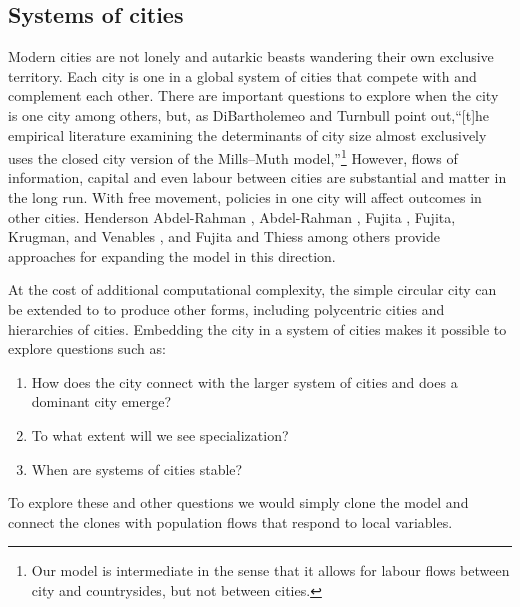 \subsection{Systems of cities}
%
Modern cities are not lonely and autarkic beasts wandering their own exclusive territory. Each city is one in a global system of cities that compete with and complement each other. 
There are important questions to explore when the city is one city among others, but, as DiBartholemeo and Turnbull \cite{dibartolomeoClosedVsOpen2023} point out,``[t]he empirical literature examining the determinants of city size almost exclusively uses the closed city version of the Mills–Muth model,''\footnote{Our model is intermediate in the sense that it allows for labour flows  between city and countrysides, but not between cities.} 
However, flows of information, capital and even labour between cities are substantial and matter in the long run. With free movement, policies in one city will affect outcomes in other cities. Henderson Abdel-Rahman \cite{Henderson1972Sizes}, Abdel-Rahman \cite{abdel-rahmanAgglomerationEconomiesTypes1990}, Fujita \cite{fujitaMonopolisticCompetitionModel1988}, Fujita, Krugman, and Venables \cite{fujitaSpatialEconomyCities1999}, and Fujita and Thiess \cite{fujitaEconomicsAgglomeration1996} among others provide approaches for expanding the model in this direction.  %

At the cost of additional computational complexity, the simple circular city can be extended to to produce other forms, including polycentric cities and hierarchies of cities. Embedding the city in a system of cities makes it possible to explore questions such as: %
\begin{enumerate}
\item How does the city connect with the larger system of cities and does a dominant city emerge? 
\item To what extent will we see specialization? 
\item When are systems of cities stable? 
\end{enumerate}
To explore these and other questions we would simply clone the model and connect the clones with population flows that respond to local variables.


